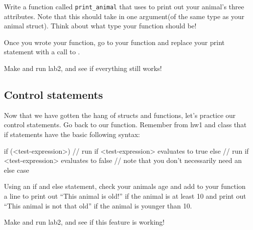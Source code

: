 \documentclass{tufte-handout}
\begin{document}
Write a function called \texttt{print\_animal} that uses  to print out your animal's three attributes.  Note that this should take in one argument(of the same type as your animal struct).  Think about what type your function should be!

Once you wrote your function, go to your  function
and replace your print statement with a call to
.

Make and run lab2, and see if everything still works!  

\subsection{Control statements}

Now that we have gotten the hang of structs and functions, let's
practice our control statements.  Go back to our
 function.  Remember from hw1 and class that if statements have the basic following syntax:
\begin{Code}
    if (<test-expression>) {
        // run if <test-expression> evaluates to true
    } else {
        // run if <test-expression> evaluates to false
        // note that you don't necessarily need an else case
    }
\end{Code}

Using an if and else statement, check your animals age and add to your
 function a line to print out ``This animal is
old!'' if the animal is at least 10 and print out ``This animal is not
that old'' if the animal is younger than 10.   

Make and run lab2, and see if this feature is working!  
\end{document}
